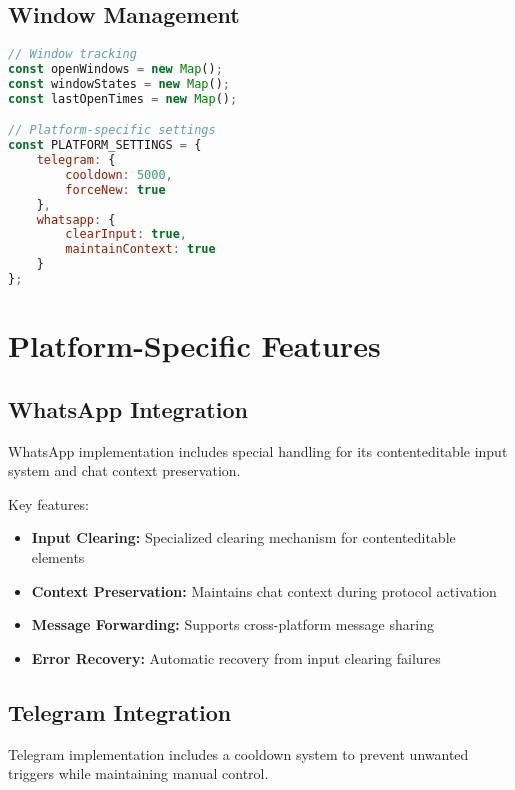 \documentclass[12pt]{article}
\begin{document}
\subsection{Window Management}
\begin{codebox}
\begin{lstlisting}[language=JavaScript]
// Window tracking
const openWindows = new Map();
const windowStates = new Map();
const lastOpenTimes = new Map();

// Platform-specific settings
const PLATFORM_SETTINGS = {
    telegram: {
        cooldown: 5000,
        forceNew: true
    },
    whatsapp: {
        clearInput: true,
        maintainContext: true
    }
};
\end{lstlisting}
\end{codebox}

\section{Platform-Specific Features}
\subsection{WhatsApp Integration}
\begin{infobox}
WhatsApp implementation includes special handling for its contenteditable input system and chat context preservation.
\end{infobox}

Key features:
\begin{itemize}
    \item \textbf{Input Clearing:} Specialized clearing mechanism for contenteditable elements
    \item \textbf{Context Preservation:} Maintains chat context during protocol activation
    \item \textbf{Message Forwarding:} Supports cross-platform message sharing
    \item \textbf{Error Recovery:} Automatic recovery from input clearing failures
\end{itemize}

\subsection{Telegram Integration}
\begin{infobox}
Telegram implementation includes a cooldown system to prevent unwanted triggers while maintaining manual control.
\end{infobox}
\end{document}
